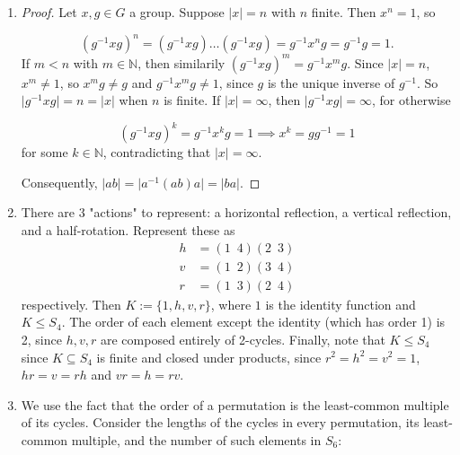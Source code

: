 \documentclass[11pt, letterpaper]{article}
\begin{document}
\thispagestyle{firststyle}


\begin{enumerate}
  \item \begin{proof}
    Let $x, g \in G$ a group. Suppose $\vert x \vert = n$ with $n$ finite. Then $x^n = 1$, so
    
    $$
    (g^{-1}xg)^n = (g^{-1}xg)\dots(g^{-1}xg) = g^{-1}x^ng = g^{-1}g = 1.
    $$
    If $m < n$ with $m \in \mathbb N$, then similarily $(g^{-1}xg)^m = g^{-1}x^mg$. Since $\vert x \vert = n$, $x^m \neq 1$, so $x^m g \neq g$ and $g^{-1}x^m g \neq 1$, since $g$ is the unique inverse of $g^{-1}$. So $\vert g^{-1}xg \vert = n = \vert x \vert$ when $n$ is finite. If $\vert x \vert = \infty$, then $\vert g^{-1}xg \vert = \infty$, for otherwise

    $$
    (g^{-1}xg)^k = g^{-1}x^kg = 1 \implies x^k = gg^{-1} = 1
    $$
    for some $k \in \mathbb N$, contradicting that $\vert x \vert = \infty$.

    Consequently, $\vert ab \vert = \vert a^{-1}(ab)a \vert = \vert ba \vert$.
  \end{proof}

  \item There are 3 "actions" to represent: a horizontal reflection, a vertical reflection, and a half-rotation. Represent these as
  \begin{align*}
    h &= (1 \enspace 4)(2 \enspace 3) \\
    v &= (1 \enspace 2)(3 \enspace 4) \\
    r &= (1 \enspace 3)(2 \enspace 4)
  \end{align*}
  respectively. Then $K := \lbrace 1, h, v, r \rbrace$, where $1$ is the identity function and $K \leq S_4$. The order of each element except the identity (which has order 1) is 2, since $h, v, r$ are composed entirely of 2-cycles. Finally, note that $K \leq S_4$ since $K \subseteq S_4$ is finite and closed under products, since $r^2 = h^2 = v^2 = 1$, $hr = v = rh$ and $vr = h = rv$.

  \item We use the fact that the order of a permutation is the least-common multiple of its cycles. Consider the lengths of the cycles in every permutation, its least-common multiple, and the number of such elements in $S_6$:
  

\end{enumerate}
\end{document}
